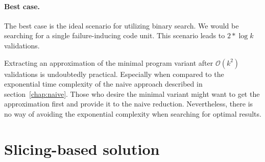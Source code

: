 \paragraph{Best case.} The best case is the ideal scenario for utilizing 
binary search. 
We would be searching for a single failure-inducing code unit. 
This scenario leads to $2 * \log{}k$ validations.

Extracting an approximation of the minimal program variant after 
$\mathcal{O}(k^2)$ validations is undoubtedly practical. 
Especially when compared to the exponential time complexity of the naive 
approach described in section~\ref{chap:naive}. 
Those who desire the minimal variant might want to get the approximation 
first and provide it to the naive reduction. 
Nevertheless, there is no way of avoiding the exponential complexity when 
searching for optimal results.

\section{Slicing-based solution}\label{chap:systematic}

